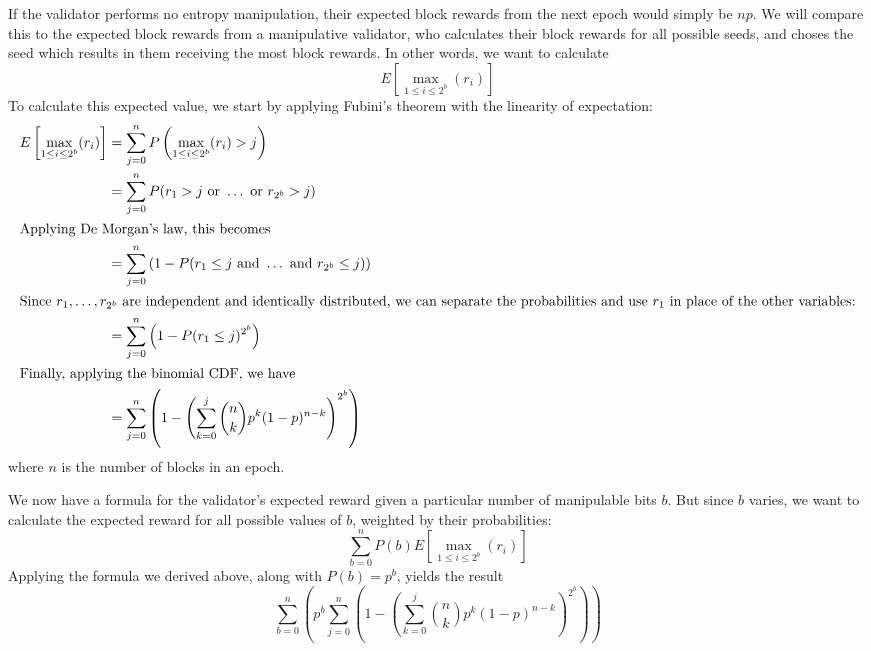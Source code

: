 If the validator performs no entropy manipulation, their expected block rewards from the next epoch would simply be $n p$. We will compare this to the expected block rewards from a manipulative validator, who calculates their block rewards for all possible seeds, and choses the seed which results in them receiving the most block rewards. In other words, we want to calculate
$$ E\left[ \max_{1 \le i \le 2^b}(r_i) \right] $$
To calculate this expected value, we start by applying Fubini's theorem with the linearity of expectation:
\begin{align*}
  E\left[ \max_{1 \le i \le 2^b}(r_i) \right] &= \sum_{j=0}^{n} P\left( \max_{1 \le i \le 2^b}(r_i) > j \right) \\
  &= \sum_{j=0}^{n} P(r_1 > j \text{ or } \dots \text { or } r_{2^b} > j) \\
  \intertext{Applying De Morgan's law, this becomes}
  &= \sum_{j=0}^{n} \left( 1 - P(r_1 \le j \text{ and } \dots \text { and } r_{2^b} \le j) \right) \\
  \intertext{Since $r_1, \dots, r_{2^b}$ are independent and identically distributed, we can separate the probabilities and use $r_1$ in place of the other variables:}
  &= \sum_{j=0}^{n} \left( 1 - P(r_1 \le j)^{2^b} \right) \\
  \intertext{Finally, applying the binomial CDF, we have}
  &= \sum_{j=0}^{n} \left( 1 - \left( \sum_{k=0}^{j} \binom{n}{k} p^k (1-p)^{n-k} \right)^{2^b} \right)
\end{align*}
where $n$ is the number of blocks in an epoch.

We now have a formula for the validator's expected reward given a particular number of manipulable bits $b$. But since $b$ varies, we want to calculate the expected reward for all possible values of $b$, weighted by their probabilities:
$$ \sum_{b=0}^{n} P(b) E\left[ \max_{1 \le i \le 2^b}(r_i) \right] $$
Applying the formula we derived above, along with $P(b) = p^b$, yields the result
$$ \sum_{b=0}^{n} \left( p^b \sum_{j=0}^{n} \left( 1 - \left( \sum_{k=0}^{j} \binom{n}{k} p^k (1-p)^{n-k} \right)^{2^b} \right) \right) $$

